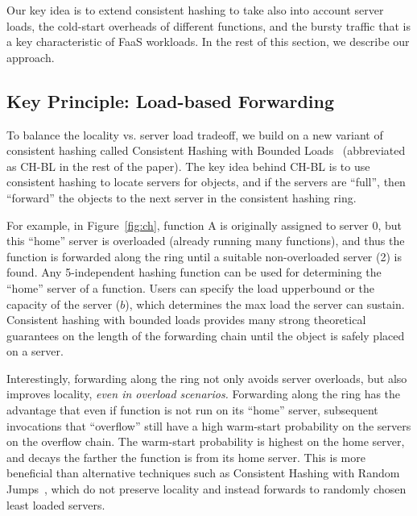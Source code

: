 Our key idea is to extend consistent hashing to take also into account server loads, the cold-start overheads of different functions, and the bursty traffic that is a key characteristic of FaaS workloads.
In the rest of this section, we describe our approach. 


\vspace*{-0.2cm}
\subsection{Key Principle: Load-based Forwarding}

To balance the locality vs. server load tradeoff, we build on a new variant of consistent hashing called Consistent Hashing with Bounded Loads~\cite{mirrokni2018consistent} (abbreviated as CH-BL in the rest of the paper).  
The key idea behind CH-BL is to use consistent hashing to locate servers for objects, and if the servers are ``full'', then ``forward'' the objects to the next server in the consistent hashing ring.

For example, in Figure~\ref{fig:ch}, function A is originally assigned to server 0, but this ``home'' server is overloaded (already running many functions), and thus the function is forwarded along the ring until a suitable non-overloaded server (2) is found. 
Any 5-independent hashing function can be used for determining the ``home'' server of a function. %
Users can specify the load upperbound or the capacity of the server ($b$), which determines the max load the server can sustain.  
Consistent hashing with bounded loads provides many strong theoretical guarantees on the length of the forwarding chain until the object is safely placed on a server. 


Interestingly, forwarding along the ring not only avoids server overloads, but also improves locality, \emph{even in overload scenarios.}
Forwarding along the ring has the advantage that even if function is not run on its ``home'' server, subsequent invocations that ``overflow'' still have a high warm-start probability on the servers on the overflow chain. %
The warm-start probability is highest on the home server, and decays the farther the function is from its home server. 
This is more beneficial than alternative techniques such as Consistent Hashing with Random Jumps~\cite{chrj-aaai21}, which do not preserve locality and instead forwards to randomly chosen least loaded servers. 

